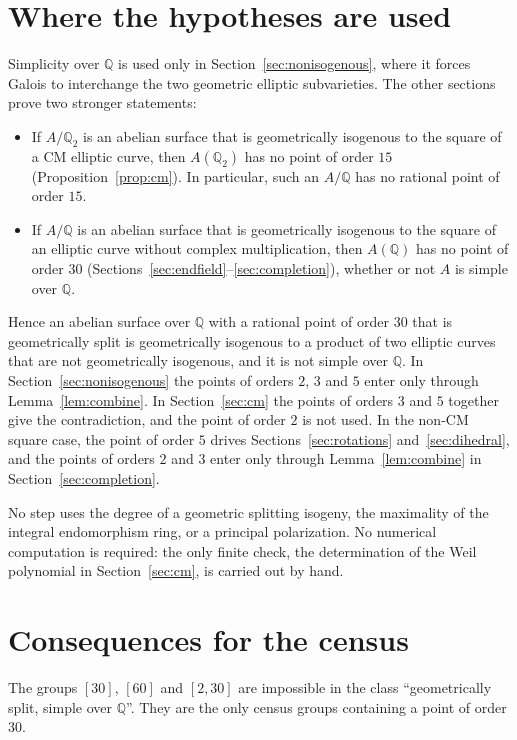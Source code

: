 \documentclass[11pt]{article}
\newcommand{\Q}{\mathbb Q}
\begin{document}
\section{Where the hypotheses are used}\label{sec:hypotheses}

Simplicity over \(\Q\) is used only in
Section~\ref{sec:nonisogenous}, where it forces Galois to interchange
the two geometric elliptic subvarieties. The other sections prove two
stronger statements:
\begin{itemize}
\item If \(A/\Q_2\) is an abelian surface that is geometrically
isogenous to the square of a CM elliptic curve, then \(A(\Q_2)\) has no
point of order \(15\) (Proposition~\ref{prop:cm}). In particular, such
an \(A/\Q\) has no rational point of order \(15\).
\item If \(A/\Q\) is an abelian surface that is geometrically isogenous
to the square of an elliptic curve without complex multiplication, then
\(A(\Q)\) has no point of order \(30\)
(Sections~\ref{sec:endfield}--\ref{sec:completion}), whether or not
\(A\) is simple over \(\Q\).
\end{itemize}
Hence an abelian surface over \(\Q\) with a rational point of order
\(30\) that is geometrically split is geometrically isogenous to a
product of two elliptic curves that are not geometrically isogenous,
and it is not simple over \(\Q\). In Section~\ref{sec:nonisogenous} the
points of orders \(2\), \(3\) and \(5\) enter only through
Lemma~\ref{lem:combine}. In Section~\ref{sec:cm} the points of orders
\(3\) and \(5\) together give the contradiction, and the point of order
\(2\) is not used. In the non-CM square case, the point of order \(5\)
drives Sections~\ref{sec:rotations} and~\ref{sec:dihedral}, and the
points of orders \(2\) and \(3\) enter only through
Lemma~\ref{lem:combine} in Section~\ref{sec:completion}.

No step uses the degree of a geometric splitting isogeny, the
maximality of the integral endomorphism ring, or a principal
polarization. No numerical computation is required: the only finite
check, the determination of the Weil polynomial in
Section~\ref{sec:cm}, is carried out by hand.

\section{Consequences for the census}

The groups
\href{https://genus-2-torsion.github.io/group.html?g=30}{\([30]\)},
\href{https://genus-2-torsion.github.io/group.html?g=60}{\([60]\)} and
\href{https://genus-2-torsion.github.io/group.html?g=2.30}{\([2,30]\)}
are impossible in the class ``geometrically split, simple over
\(\Q\)''. They are the only census groups containing a point of order
\(30\).
\end{document}
